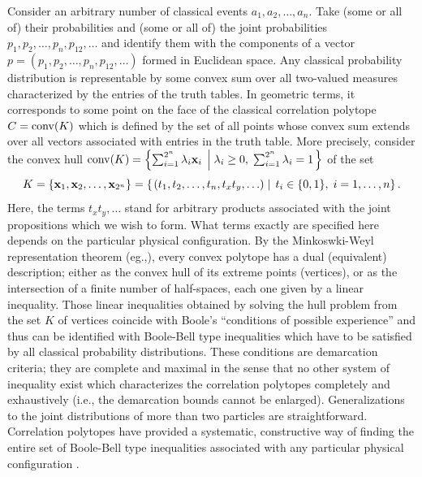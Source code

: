 Consider an arbitrary number of classical events $a_1, a_2,\ldots , a_n$.
Take (some or all of) their probabilities
and (some or all of) the joint probabilities
$p_1, p_2,\ldots , p_n, p_{12},\ldots $
and identify them with the components of
a vector  $p=(p_1, p_2,\ldots , p_n, p_{12},\ldots )$
formed in Euclidean space.
Any classical probability distribution is representable by some convex sum over
all two-valued measures characterized by the entries of the truth tables.
In geometric terms, it corresponds to
some point on the face of the classical correlation polytope $C={\rm conv} (K)$
which is defined by the set of all points whose
convex sum extends over all vectors associated with entries in the truth table.
More precisely,
consider the convex hull
${\rm conv} (K)=\left\{ \sum_{i=1}^{2^n} \lambda_i{\bf x}_i
  \; \left|  \;
\lambda_i\ge 0,\; \sum_{i=1}^{2^n}\lambda_i =1
\right.
\right\} $
of the set
$$K
=\{{\bf x}_1,{\bf x}_2,\ldots ,{\bf x}_{2^n}\}
= \left\{
\left.
\large(t_1, t_2,\ldots , t_n, t_xt_y,\ldots \large)
\; \right| \;
t_i \in \{0,1\},\; i=1,\ldots ,n
\right\}.$$
Here, the terms $t_xt_y,\ldots$ stand for arbitrary products associated with
the joint propositions which we wish to form. What terms exactly are
specified here depends on the particular physical configuration.
By the Minkoswki-Weyl representation theorem (eg.,\cite[p.29]{ziegler}),
every convex polytope has a dual (equivalent) description;
either as the convex hull of its extreme points (vertices),
or as the intersection of a finite number of half-spaces,
each one given by a linear inequality.
Those linear inequalities obtained by solving the hull problem from the set $K$ of vertices
coincide with Boole's ``conditions of possible experience''
and thus can be identified with Boole-Bell type inequalities which have to be satisfied by
all classical probability distributions.
These conditions are demarcation criteria;
they are complete and maximal in the sense that no other system of inequality exist
which characterizes the correlation polytopes completely and exhaustively
(i.e., the demarcation bounds cannot be enlarged).
Generalizations to the joint distributions of more than two particles are straightforward.
Correlation polytopes have provided a systematic, constructive way of finding
the entire set of Boole-Bell type inequalities associated with any particular physical configuration
\cite{2000-poly,2001-cddif}.


